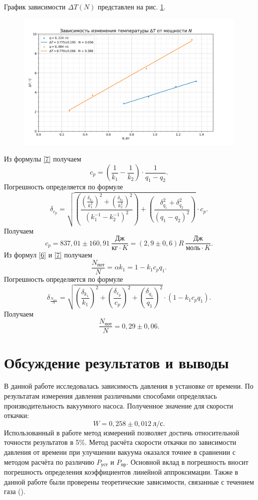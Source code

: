 \documentclass[a4paper, 12pt]{article}
\begin{document}
График зависимости $\Delta{T}(N)$ представлен на рис. \ref{ris3}.
\begin{figure}[h!]
\begin{flushleft}
    \includegraphics[scale=0.75]{2.1.1.png}
\end{flushleft}
\caption{}
\label{ris3}
\end{figure}

Из формулы \eqref{7} получаем $$c_p = \left(\frac{1}{k_1} - \frac{1}{k_2}\right) \cdot \frac{1}{q_1 - q_2}.$$ Погрешность определяется по формуле $$\delta_{c_p} = \sqrt{\left(\frac{\left(\frac{\delta_{k_1}}{k_1^2}\right)^2 + \left(\frac{\delta_{k_2}}{k_2^2}\right)^2}{(k_1^{-1} - k_2^{-1})^2}\right) + \left(\frac{\delta_{q_1}^2 + \delta_{q_2}^2}{(q_1 - q_2)^2}\right)} \cdot c_p.$$ Получаем $$\boxed{c_p = 837,01\pm160,91~\frac{Дж}{кг \cdot K} = (2,9\pm0,6)R~\frac{Дж}{моль \cdot K}}.$$ Из формул \eqref{6} и \eqref{7} получаем $$\frac{N_{пот}}{N} = \alpha k_1 = 1 - k_1 c_p q_1.$$ Погрешность определяется по формуле $$\delta_{\frac{N_{пот}}{N}} = \sqrt{\left(\frac{\delta_{k_1}}{k_1}\right)^2 + \left(\frac{\delta_{c_p}}{c_p}\right)^2 + \left(\frac{\delta_{q_1}}{q_1}\right)^2} \cdot (1 - k_1 c_p q_1).$$ Получаем $$\boxed{\frac{N_{пот}}{N} = 0,29\pm0,06}.$$

\section{Обсуждение результатов и выводы}

В данной работе исследовалась зависимость давления в установке от времени. По результатам измерения давления различными способами определялась производительность вакуумного насоса. Полученное значение для скорости откачки:
\[\boxed{W = 0,258\pm0,012~л/с}.\]
Использованный в работе метод измерений позволяет достичь относительной точности результатов в 5\%. Метод расчёта скорости откачки по зависимости давления от времени при улучшении вакуума оказался точнее в сравнении с методом расчёта по различию $P_{уст}$ и $P_{пр}$. Основной вклад в погрешность вносит погрешность определения коэффициентов линейной аппроксимации.
Также в данной работе были проверены теоретические зависимости, связанные с течением газа ().
\end{document}
